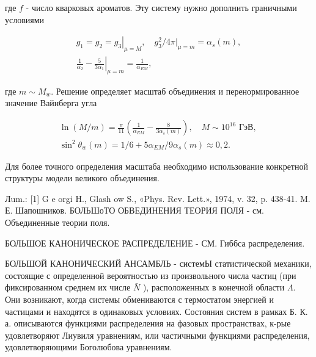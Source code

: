 \documentclass[10pt]{article}
\begin{document}
где $f$ - число кварковых ароматов. Эту систему нужно дополнить граничными условиями



\[

\begin{gathered}

g_{1}=g_{2}=\left.g_{3}\right|_{\mu=M}, \quad g_{3}^{2} /\left.4 \pi\right|_{\mu=m}=\alpha_{s}(m), \\

\frac{1}{\alpha_{2}}-\left.\frac{5}{3 \alpha_{1}}\right|_{\mu=m}=\frac{1}{\alpha_{E M}},

\end{gathered}

\]



где $m \sim M_{w}$. Решение определяет масштаб объединения и перенормированное значение Вайнберга угла



\[

\begin{gathered}

\ln (M / m)=\frac{\pi}{11}\left(\frac{1}{\alpha_{E M}}-\frac{8}{3 \alpha_{s}(m)}\right), \quad M \sim 10^{16} \text { ГэВ, } \\

\sin ^{2} \theta_{w}(m)=1 / 6+5 \alpha_{E M} / 9 \alpha_{s}(m) \approx 0,2 .

\end{gathered}

\]



Для более точного определения масштаба необходимо использование конкретной структуры модели великого объединения.



Лum.: [1] G e orgi H., Glash ow S., «Phys. Rev. Lett.», 1974, v. 32, p. 438-41. M. Е. Шапошников. БОЛЬШоТО ОБВЕДИНЕНИЯ ТЕОРИЯ ПОЛЯ - см. Объединенные теории поля.



БОЛЬШОЕ КАНОНИЧЕСКОЕ РАСПРЕДЕЛЕНИЕ - СМ. Гиббса распределения.



БОЛЬШОЙ КАНОНИЧЕСКИЙ АНСАМБЛЬ - системЫ статистической механики, состоящие с определенной вероятностью из произвольного числа частиц (при фиксированном среднем их числе $\bar{N}$ ), расположенных в конечной области $\Lambda$. Они возникают, когда системы обмениваются с термостатом энергией и частицами и находятся в одинаковых условиях. Состояния систем в рамках Б. К. а. описываются функциями распределения на фазовых пространствах, к-рые удовлетворяют Лиувиля уравнениям, или частичными функциями распределения, удовлетворяющими Боголюбова уравнениям.
\end{document}
